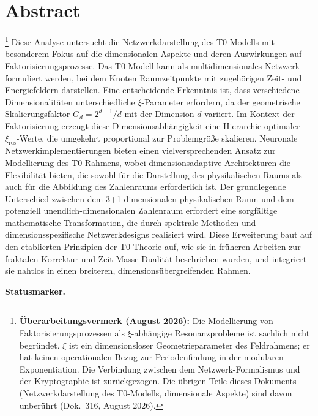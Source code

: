 \section*{Abstract}

\footnote{\textbf{Überarbeitungsvermerk (August 2026):} Die Modellierung von Faktorisierungsprozessen als $\xi$-abhängige Resonanzprobleme ist sachlich nicht begründet. $\xi$ ist ein dimensionsloser Geometrieparameter des Feldrahmens; er hat keinen operationalen Bezug zur Periodenfindung in der modularen Exponentiation. Die Verbindung zwischen dem Netzwerk-Formalismus und der Kryptographie ist zurückgezogen. Die übrigen Teile dieses Dokuments (Netzwerkdarstellung des T0-Modells, dimensionale Aspekte) sind davon unberührt (Dok.~316, August 2026).}
	Diese Analyse untersucht die Netzwerkdarstellung des T0-Modells mit besonderem Fokus auf die dimensionalen Aspekte und deren Auswirkungen auf Faktorisierungsprozesse. Das T0-Modell kann als multidimensionales Netzwerk formuliert werden, bei dem Knoten Raumzeitpunkte mit zugehörigen Zeit- und Energiefeldern darstellen. Eine entscheidende Erkenntnis ist, dass verschiedene Dimensionalitäten unterschiedliche $\xi$-Parameter erfordern, da der geometrische Skalierungsfaktor $G_d = 2^{d-1}/d$ mit der Dimension $d$ variiert. Im Kontext der Faktorisierung erzeugt diese Dimensionsabhängigkeit eine Hierarchie optimaler $\xi_{\text{res}}$-Werte, die umgekehrt proportional zur Problemgröße skalieren. Neuronale Netzwerkimplementierungen bieten einen vielversprechenden Ansatz zur Modellierung des T0-Rahmens, wobei dimensionsadaptive Architekturen die Flexibilität bieten, die sowohl für die Darstellung des physikalischen Raums als auch für die Abbildung des Zahlenraums erforderlich ist. Der grundlegende Unterschied zwischen dem 3+1-dimensionalen physikalischen Raum und dem potenziell unendlich-dimensionalen Zahlenraum erfordert eine sorgfältige mathematische Transformation, die durch spektrale Methoden und dimensionsspezifische Netzwerkdesigns realisiert wird. Diese Erweiterung baut auf den etablierten Prinzipien der T0-Theorie auf, wie sie in früheren Arbeiten zur fraktalen Korrektur und Zeit-Masse-Dualität beschrieben wurden, und integriert sie nahtlos in einen breiteren, dimensionsübergreifenden Rahmen.

\medskip\noindent\textbf{Statusmarker.}



